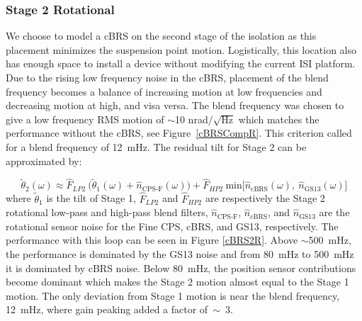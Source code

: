 \documentclass [12pt, proquest]{uwthesis}[2019]
\begin{document}
\subsubsection{Stage 2 Rotational}


We choose to model a cBRS on the second stage of the isolation as this placement minimizes the suspension point motion. Logistically, this location also has enough space to install a device without modifying the current ISI platform. Due to the rising low frequency noise in the cBRS, placement of the blend frequency becomes a balance of increasing motion at low frequencies and decreasing motion at high, and visa versa. The blend frequency was chosen to give a low frequency RMS motion of $\sim$10 nrad$/\sqrt{\text{Hz}}$ which matches the performance without the cBRS, see Figure~\ref{cBRSCompR}. This criterion called for a blend frequency of 12~mHz. The residual tilt for Stage 2 can be approximated by:

\begin{equation}
\tilde{\theta}_2(\omega)\approx \hat{F}_{LP2}\ \big(\tilde{\theta}_1(\omega)+\hat{n}_\text{CPS-F}(\omega)\big)+\hat{F}_{HP2}\ \text{min}\big[\hat{n}_\text{cBRS}(\omega),\ \hat{n}_\text{GS13}(\omega)\big]
\end{equation}
where $\tilde{\theta}_1$ is the tilt of Stage 1, $\hat{F}_{LP2}$ and $\hat{F}_{HP2}$ are respectively the Stage 2 rotational low-pass and high-pass blend filters, $\hat{n}_\text{CPS-F}$, $\hat{n}_\text{cBRS}$, and $\hat{n}_\text{GS13}$ are the rotational sensor noise for the Fine CPS, cBRS, and GS13, respectively. The performance with this loop can be seen in Figure \ref{cBRS2R}. Above $\sim$500~mHz, the performance is dominated by the GS13 noise and from 80~mHz to 500~mHz it is dominated by cBRS noise. Below 80~mHz, the position sensor contributions become dominant which makes the Stage 2 motion almost equal to the Stage 1 motion. The only deviation from Stage 1 motion is near the blend frequency, 12~mHz, where gain peaking added a factor of~$\sim$~3. 
\end{document}
